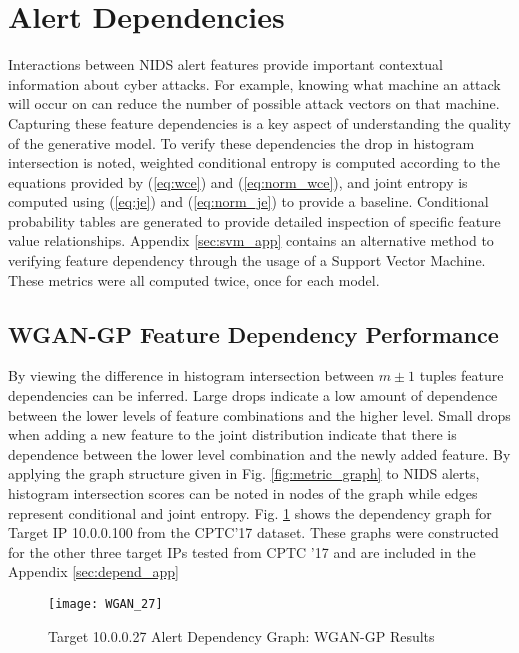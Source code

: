 \section{Alert Dependencies}
\label{sec:depend}

Interactions between NIDS alert features provide important contextual information about cyber attacks. For example, knowing what machine an attack will occur on can reduce the number of possible attack vectors on that machine. Capturing these feature dependencies is a key aspect of understanding the quality of the generative model. To verify these dependencies the drop in histogram intersection is noted, weighted conditional entropy is computed according to the equations provided by (\ref{eq:wce}) and (\ref{eq:norm_wce}), and joint entropy is computed using (\ref{eq:je}) and (\ref{eq:norm_je}) to provide a baseline. Conditional probability tables are generated to provide detailed inspection of specific feature value relationships. Appendix \ref{sec:svm_app} contains an alternative method to verifying feature dependency through the usage of a Support Vector Machine. These metrics were all computed twice, once for each model.

\subsection{WGAN-GP Feature Dependency Performance}

By viewing the difference in histogram intersection between $m\pm1$ tuples feature dependencies can be inferred. Large drops indicate a low amount of dependence between the lower levels of feature combinations and the higher level. Small drops when adding a new feature to the joint distribution indicate that there is dependence between the lower level combination and the newly added feature. By applying the graph structure given in Fig. \ref{fig:metric_graph} to NIDS alerts, histogram intersection scores can be noted in nodes of the graph while edges represent conditional and joint entropy. Fig. \ref{fig:alert_depend_1} shows the dependency graph for Target IP 10.0.0.100 from the CPTC'17 dataset. These graphs were constructed for the other three target IPs tested from CPTC '17 and are included in the Appendix \ref{sec:depend_app}

\begin{figure}[!htbp]
	\centering
	\texttt{[image: WGAN\_27]}
	\caption{
		Target 10.0.0.27 Alert Dependency Graph: WGAN-GP Results
	}
	\label{fig:alert_depend_1}
\end{figure}

